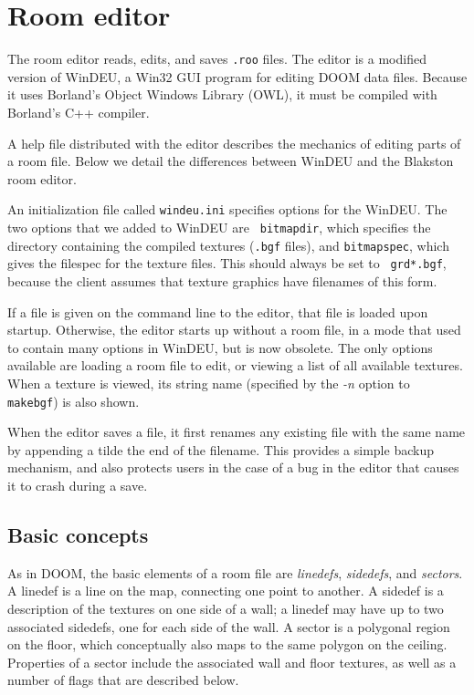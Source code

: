 \section{Room editor}

The room editor reads, edits, and saves {\tt .roo} files.  The editor
is a modified version of WinDEU, a Win32 GUI program for editing DOOM
data files.  Because it uses Borland's Object Windows Library (OWL),
it must be compiled with Borland's C++ compiler.

A help file distributed with the editor describes the mechanics of
editing parts of a room file.  Below we detail the differences between
WinDEU and the Blakston room editor.

An initialization file called {\tt windeu.ini} specifies options for
the WinDEU.  The two options that we added to WinDEU are {\tt
bitmapdir}, which specifies the directory containing the compiled
textures ({\tt .bgf} files), and {\tt bitmapspec}, which gives the
filespec for the texture files.  This should always be set to {\tt
grd*.bgf}, because the client assumes that texture graphics have
filenames of this form.

If a file is given on the command line to the editor, that file is
loaded upon startup.  Otherwise, the editor starts up without a room
file, in a mode that used to contain many options in WinDEU, but is
now obsolete.  The only options available are loading a room file to
edit, or viewing a list of all available textures.  When a texture is
viewed, its string name (specified by the {\em -n} option to {\tt
makebgf}) is also shown.

When the editor saves a file, it first renames any existing file with
the same name by appending a tilde the end of the filename.  This
provides a simple backup mechanism, and also protects users in the
case of a bug in the editor that causes it to crash during a save.

\subsection{Basic concepts}

As in DOOM, the basic elements of a room file are {\em linedefs}, {\em
sidedefs}, and {\em sectors}.  A linedef is a line on the map,
connecting one point to another.  A sidedef is a description of the
textures on one side of a wall; a linedef may have up to two
associated sidedefs, one for each side of the wall.  A sector is a
polygonal region on the floor, which conceptually also maps to the
same polygon on the ceiling.  Properties of a sector include the
associated wall and floor textures, as well as a number of flags that
are described below.

